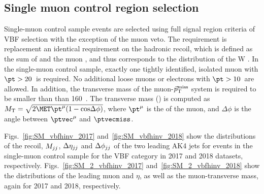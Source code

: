 \newpage

\subsection{Single muon control region selection}
\label{sec:selection_cr_1m}

Single-muon control sample events are selected using full signal region criteria of VBF selection with the exception of the muon veto. 
The \ptmiss requirement is replacement an identical requirement on the hadronic recoil, which is defined as the sum of \ptvecmiss and the muon \vpt, 
and thus corresponds to the distribution of the W \pt.
In the single-muon control sample, exactly one tightly identified, isolated muon with $\pt > 20$~\GeV is required. 
No additional loose muons or electrons with $\pt > 10$~\GeV are allowed.
In addition, the transverse mass of the muon-$\vec p_{\rm T}^{\rm miss}$ system is required to be smaller than than 160~\GeV.
The transverse mass (\mt) is computed as $\mt = \sqrt{2\MET \pt^{\mu} (1 - \mathrm{cos}\Delta\phi)}$, 
where $\pt^{\mu}$ is the \pt of the muon, and $\Delta\phi$ is the angle between $\ptvec^{\mu}$ and $\ptvecmiss$.


Figs.~\ref{fig:SM_vbfhinv_2017} and~\ref{fig:SM_vbfhinv_2018} show the distributions of the recoil, 
$M_{jj}$, $\Delta \eta_{jj}$ and $\Delta \phi_{jj}$ of the two leading AK4 jets
for events in the single-muon control sample for the VBF category in 2017 and 2018 datasets, respectively. 
Figs.~\ref{fig:SM_2_vbfhinv_2017} and~\ref{fig:SM_2_vbfhinv_2018} show the distributions of the leading muon \pt and $\eta$, 
as well as the muon-\ptmiss transverse mass, again for 2017 and 2018, respectively. 

